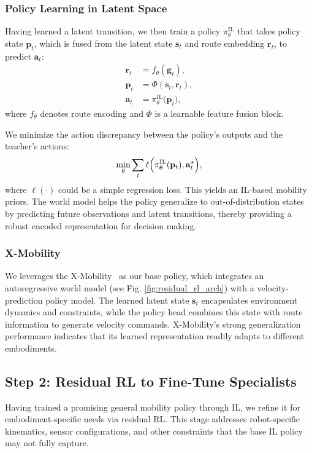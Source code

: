 \documentclass[letterpaper, 10 pt,conference]{ieeeconf}
\begin{document}
\subsubsection{Policy Learning in Latent Space}
Having learned a latent transition, we then train a policy $\pi_{\theta}^{\text{IL}}$ that takes policy state $\mathbf{p}_t$, which is fused from the latent state $\mathbf{s}_t$ and route embedding $\mathbf{r}_t$, to predict $\mathbf{a}_t$:
\begin{align}
    \mathbf{r}_t &= f_{\theta}(\mathbf{g}_t), \\
    \mathbf{p}_t &= \Phi( \mathbf{s}_t, \mathbf{r}_t), \\
    \mathbf{a}_t &= \pi_{\theta}^{\text{IL}}\bigl(\mathbf{p}_t\bigr),
\end{align}
where $f_{\theta}$ denotes route encoding and $\Phi$ is a learnable feature fusion block.

We minimize the action discrepancy between the policy’s outputs and the teacher’s actions:
\[
    \min_{\theta} \sum_{t} \ell \Bigl(\pi_{\theta}^{\text{IL}}(\mathbf{p}_t), \mathbf{a}_t^{\star}\Bigr),
\]
where $\ell(\cdot)$ could be a simple regression loss. This yields an IL-based mobility priors. The world model helps the policy generalize to out-of-distribution states by predicting future observations and latent transitions, thereby providing a robust encoded representation for decision making.

\subsubsection{X-Mobility}
We leverages the X-Mobility~\cite{liu2024x} as our base policy, which integrates an autoregressive world model (see Fig. \ref{fig:residual_rl_arch}) with a velocity-prediction policy model. The learned latent state $\mathbf{s}_t$ encapsulates environment dynamics and constraints, while the policy head combines this state with route information to generate velocity commands. X-Mobility’s strong generalization performance indicates that its learned representation readily adapts to different embodiments.


\subsection{Step 2: Residual RL to Fine-Tune Specialists}
\label{sec:residual_rl}

Having trained a promising general mobility policy through IL, we refine it for embodiment-specific needs via residual RL. This stage addresses robot-specific kinematics, sensor configurations, and other constraints that the base IL policy may not fully capture.
\end{document}
